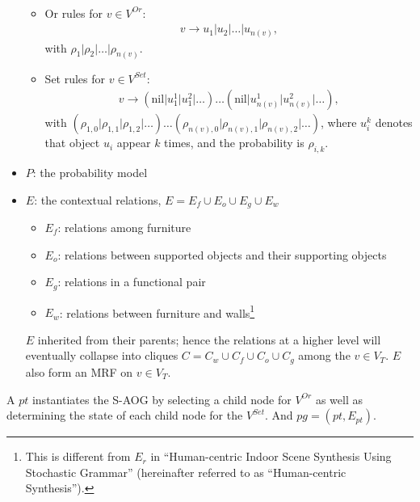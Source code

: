 \documentclass[10pt]{article}
\begin{document}
\begin{itemize}
\begin{itemize}
\begin{align}
        \end{align}
      \item Or rules for $v \in V^{Or}$:
        \begin{align}
          \label{eq:2}
          v \rightarrow u_1 \vert u_2 \vert \ldots \vert u_{n(v)},
        \end{align}
        with $\rho_1 \vert \rho_2 \vert \ldots \vert \rho_{n(v)}$.
      \item Set rules for $v \in V^{Set}$:
        \begin{align}
          \label{eq:3}
          v \rightarrow (\text{nil} \vert u^1_1 \vert u^2_1 \vert \ldots) \dots (\text{nil} \vert u^1_{n(v)} \vert u^2_{n(v)} \vert \ldots),
        \end{align}
        with $(\rho_{1,0} \vert \rho_{1,1} \vert \rho_{1,2} \vert \ldots) \ldots (\rho_{n(v),0} \vert \rho_{n(v),1} \vert \rho_{n(v),2} \vert \ldots)$,
        where $u^k_i$ denotes that object $u_i$ appear $k$ times, and the
        probability is $\rho_{i,k}$.
    \end{itemize}
  \item $P$: the probability model
  \item $E$: the contextual relations, $E = E_f \cup E_o \cup E_g \cup E_w$
    \begin{itemize}
      \item $E_f$: relations among furniture
      \item $E_o$: relations between supported objects and their supporting
        objects
      \item $E_g$: relations in a functional pair
      \item $E_w$: relations between furniture and walls\footnote{This is
        different from $E_r$ in ``Human-centric Indoor Scene Synthesis Using
        Stochastic Grammar'' (hereinafter referred to as ``Human-centric
        Synthesis'').}
    \end{itemize}
    $E$ inherited from their parents; hence the relations at a higher level
    will eventually collapse into cliques $C = C_w \cup C_f \cup C_o \cup C_g$
    among the $v \in V_T$. $E$ also form an MRF on $v \in V_T$.
\end{itemize}

A $pt$ instantiates the S-AOG by selecting a child node for $V^{Or}$ as well as
determining the state of each child node for the $V^{Set}$. And
$pg = (pt, E_{pt})$.

\end{document}
